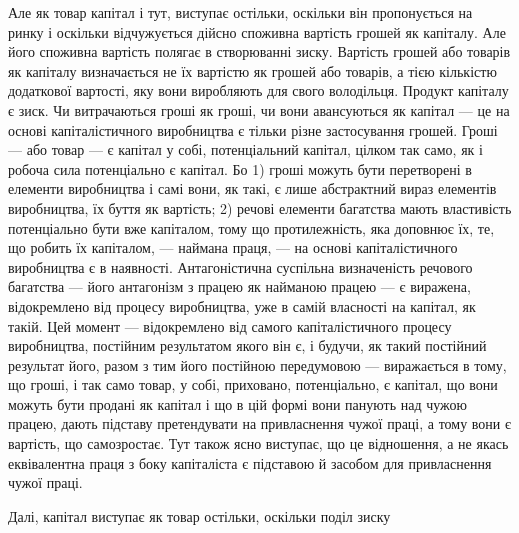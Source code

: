 Але як товар капітал і тут, виступає остільки, оскільки він
пропонується на ринку і оскільки відчужується дійсно споживна
вартість грошей як капіталу. Але його споживна вартість полягає
в створюванні зиску. Вартість грошей або товарів як капіталу
визначається не їх вартістю як грошей або товарів, а тією
кількістю додаткової вартості, яку вони виробляють для свого
володільця. Продукт капіталу є зиск. Чи витрачаються гроші
як гроші, чи вони авансуються як капітал — це на основі капіталістичного
виробництва є тільки різне застосування грошей.
Гроші — або товар — є капітал у собі, потенціальний капітал, цілком
так само, як і робоча сила потенціально є капітал. Бо
1) гроші можуть бути перетворені в елементи виробництва і самі
вони, як такі, є лише абстрактний вираз елементів виробництва,
їх буття як вартість; 2) речові елементи багатства мають
властивість потенціально бути вже капіталом, тому що протилежність,
яка доповнює їх, те, що робить їх капіталом, — наймана
праця, — на основі капіталістичного виробництва є в наявності.
Антагоністична суспільна визначеність речового багатства —
його антагонізм з працею як найманою працею — є виражена,
відокремлено від процесу виробництва, уже в самій власності
на капітал, як такій. Цей момент — відокремлено від самого капіталістичного
процесу виробництва, постійним результатом якого
він є, і будучи, як такий постійний результат його, разом з тим
його постійною передумовою — виражається в тому, що гроші,
і так само товар, у собі, приховано, потенціально, є капітал, що
вони можуть бути продані як капітал і що в цій формі вони панують
над чужою працею, дають підставу претендувати на привласнення
чужої праці, а тому вони є вартість, що самозростає.
Тут також ясно виступає, що це відношення, а не якась еквівалентна
праця з боку капіталіста є підставою й засобом для привласнення
чужої праці.

Далі, капітал виступає як товар остільки, оскільки поділ зиску
\parbreak{}  %
